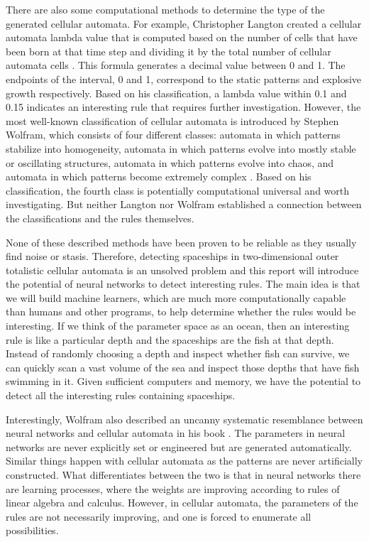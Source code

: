\documentclass[12pt]{article}
\numberwithin{figure}{section} %
\begin{document}
There are also some computational methods to determine the type of the generated cellular automata. For example, Christopher Langton created a cellular automata lambda value that is computed based on the number of cells that have been born at that time step and dividing it by the total number of cellular automata cells \cite{Edge of Chaos}. This formula generates a decimal value between 0 and 1. The endpoints of the interval, 0 and 1, correspond to the static patterns and explosive growth respectively. Based on his classification, a lambda value within 0.1 and 0.15 indicates an interesting rule that requires further investigation. However, the most well-known classification of cellular automata is introduced by Stephen Wolfram, which consists of four different classes: automata in which patterns stabilize into homogeneity, automata in which patterns evolve into mostly stable or oscillating structures, automata in which patterns evolve into chaos, and automata in which patterns become extremely complex \cite{Cellular automaton}. Based on his classification, the fourth class is potentially computational universal and worth investigating. But neither Langton nor Wolfram established a connection between the classifications and the rules themselves.  

None of these described methods have been proven to be reliable as they usually find noise or stasis. Therefore, detecting spaceships in two-dimensional outer totalistic cellular automata is an unsolved problem and this report will introduce the potential of neural networks to detect interesting rules. The main idea is that we will build machine learners, which are much more computationally capable than humans and other programs, to help determine whether the rules would be interesting. If we think of the parameter space as an ocean, then an interesting rule is like a particular depth and the spaceships are the fish at that depth. Instead of randomly choosing a depth and inspect whether fish can survive, we can quickly scan a vast volume of the sea and inspect those depths that have fish swimming in it. Given sufficient computers and memory, we have the potential to detect all the interesting rules containing spaceships. 

Interestingly, Wolfram also described an uncanny systematic resemblance between neural networks and cellular automata in his book \cite{A new kind of Science}. The parameters in neural networks are never explicitly set or engineered but are generated automatically. Similar things happen with cellular automata as the patterns are never artificially constructed. What differentiates between the two is that in neural networks there are learning processes, where the weights are improving according to rules of linear algebra and calculus. However, in cellular automata, the parameters of the rules are not necessarily improving, and one is forced to enumerate all possibilities.
\end{document}
